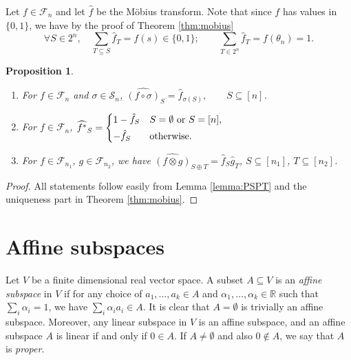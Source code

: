\documentclass[12pt]{article}
\newtheorem{prop}{Proposition}
\theoremstyle{definition}
\theoremstyle{remark}
\def\Fe{\mathcal F}
\def\permut{\mathscr{S}}
\begin{document}
Let $f\in \Fe_n$ and let $\hat f$ be the M\"obius transform. Note that since $f$ has
values in $\{0,1\}$, we have by the proof of Theorem \ref{thm:mobius}
\[
\forall S\in 2^n, \quad \sum_{T\subseteq S} \hat f_T=f(s)\in \{0,1\}; \qquad \sum_{T\in 2^n} \hat
f_T=f(\theta_n)=1.
\]



\begin{prop}\label{prop:mobius} 

\begin{enumerate}
\item[(i)] For $f\in \Fe_n$ and  $\sigma\in \permut_n$, 
$\widehat{(f\circ \sigma)}_S=\hat f_{\sigma(S)}, \qquad S\subseteq [n]$.
\item[(ii)] For $f\in \Fe_n$, $\widehat{f^*}_S=\begin{dcases} 1-\hat f_S & S=\emptyset\text{ or } S=[n],\\
-\hat f_S & \text{otherwise}.
\end{dcases}$
\item[(iii)] For $f\in \Fe_{n_1}$, $g\in \Fe_{n_2}$, we have 
$\widehat{(f\otimes g)}_{S\oplus T}=\hat f_S\hat g_T$, $S\subseteq [n_1]$, $T\subseteq
[n_2]$.
%
\end{enumerate}


\end{prop}

\begin{proof} All statements follow easily from Lemma \ref{lemma:PSPT} and the uniqueness part in Theorem
\ref{thm:mobius}. 


\end{proof}

\section{Affine subspaces}
\label{sec:app_affine}
Let $V$ be a finite dimensional real vector space. A subset $A\subseteq V$ is an {\em affine
subspace} in $V$ if for any choice of  $a_1,\dots, a_k\in A$ and  $\alpha_1,\dots,\alpha_k\in \mathbb R$
such that $\sum_i\alpha_i=1$, we have $\sum_i\alpha_i a_i\in A$. It is clear that
$A=\emptyset$ is trivially an affine subspace.  Moreover, any linear subspace in $V$ is an affine subspace,
and an
affine subspace $A$ is linear if and only if $0\in A$. If $A \neq\emptyset$ and also
$0\notin A$, we say that $A$ is {\em proper}. 
\end{document}
